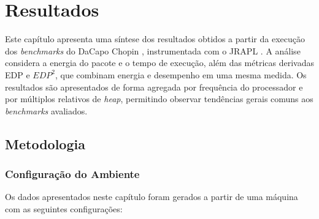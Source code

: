 \chapter{Resultados}
\label{chap:resultados}

Este capítulo apresenta uma síntese dos resultados obtidos a partir da execução 
dos \textit{benchmarks} do DaCapo Chopin \cite{dacapochopin}, instrumentada com o JRAPL
\cite{jrapl}. A análise considera a energia do pacote e o tempo de execução,
além das métricas derivadas EDP e \(EDP^2\), que combinam energia e desempenho
em uma mesma medida. Os resultados são apresentados de forma
agregada por frequência do processador e por múltiplos relativos de
\textit{heap}, permitindo observar tendências gerais comuns aos
\textit{benchmarks} avaliados.

\section{Metodologia}

\subsection{Configuração do Ambiente}

Os dados apresentados neste capítulo foram gerados a partir de uma
máquina com as seguintes configurações:

